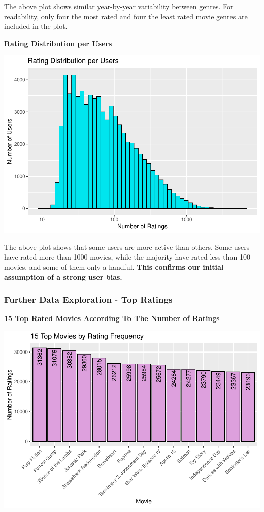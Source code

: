 \documentclass[
]{article}
\begin{document}
The above plot shows similar year-by-year variability between genres.
For readability, only four the most rated and four the least rated movie
genres are included in the plot.

\newpage

\textbf{Rating Distribution per Users}

\begin{center}\includegraphics{MovieLens-Report_MitjaPrah_files/figure-latex/unnamed-chunk-30-1} \end{center}

The above plot shows that some users are more active than others. Some
users have rated more than 1000 movies, while the majority have rated
less than 100 movies, and some of them only a handful. \textbf{This
confirms our initial assumption of a strong user bias.}

\newpage

\hypertarget{further-data-exploration---top-ratings}{%
\subsubsection{Further Data Exploration - Top
Ratings}\label{further-data-exploration---top-ratings}}

\textbf{15 Top Rated Movies According To The Number of Ratings}

\begin{center}\includegraphics{MovieLens-Report_MitjaPrah_files/figure-latex/unnamed-chunk-31-1} \end{center}
\end{document}
